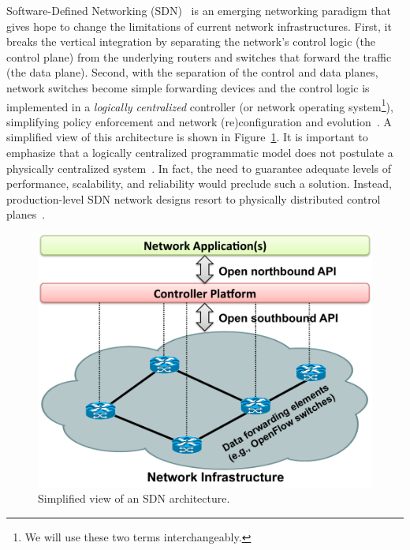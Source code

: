 Software-Defined Networking (SDN)~\cite{mckeown2011,schenker2011} 
 is an emerging networking paradigm that gives hope to change the limitations of current
 network infrastructures. First, it breaks the vertical integration by separating the network's 
control logic (the control plane) from the underlying routers and switches that 
forward the traffic (the data plane). Second, with the separation of the control
and data planes, network switches become simple forwarding devices and
the control logic is implemented in a \textit{logically centralized}
controller (or network operating system\footnote{We will use these two
terms interchangeably.}), simplifying policy enforcement and network 
(re)configuration and evolution~\cite{kim2013}. A simplified view of this 
architecture is shown in Figure~\ref{fig:sdn_simple}.  It is important
to emphasize that a logically centralized programmatic model does not
postulate a physically centralized system~\cite{koponen-1}.  In fact, the need to
guarantee adequate levels of performance, scalability, and reliability
would preclude such a solution.  Instead,
production-level SDN network designs resort to physically distributed
control planes~\cite{jain2013-1,koponen-1}.

\begin{figure}[t!]
\centering
\includegraphics[width=0.95\columnwidth]{figures/fig1_sdn_simple.pdf}
\caption{Simplified view of an SDN architecture.}
\label{fig:sdn_simple}
\end{figure}

